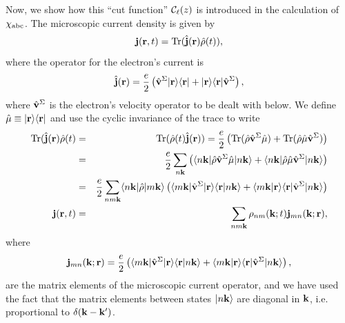 \documentclass{article}
\begin{document}
Now, we show how this ``cut function'' ${\mathbf{\cal C}}_\ell(z)$ is introduced in
the calculation of $\chi_{\mathrm{a}\mathrm{b}\mathrm{c}}$.
The microscopic current density is given by
\begin{equation}\label{jmic}
\mathbf{j}(\mathbf{r},t)=\mathrm{Tr}(\hat{\mathbf{j}}(\mathbf{r})\hat\rho(t)),
\end{equation}
where the operator for the electron's current is
\begin{equation}\label{hatjmic}
\hat{\mathbf{j}}(\mathbf{r})=\frac{e}{2}\left(\hat{\mathbf{v}}^\Sigma| \mathbf{r} \rangle\langle \mathbf{r} |
+| \mathbf{r} \rangle\langle \mathbf{r} |\hat{\mathbf{v}}^\Sigma\right), 
\end{equation}
where $\hat{\mathbf{v}}^\Sigma$ is the electron's velocity operator to be dealt
with below. We define
$\hat\mu\equiv| \mathbf{r} \rangle\langle \mathbf{r} |$ and use the cyclic invariance of
the trace to write
\begin{eqnarray}\label{jmic2}
\mathrm{Tr}(\hat{\mathbf{j}}(\mathbf{r})\hat\rho(t)&=&\mathrm{Tr}(\hat\rho(t)\hat{\mathbf{j}}(\mathbf{r}))=
\frac{e}{2}
\left(
\mathrm{Tr}(\hat\rho\hat{\mathbf{v}}^\Sigma\hat\mu)
+
\mathrm{Tr}(\hat\rho\hat\mu\hat{\mathbf{v}}^\Sigma)
\right)
\nonumber\\
&=&
\frac{e}{2}
\sum_{n\mathbf{k}}
\left(
\langle n\mathbf{k} |\hat\rho\hat{\mathbf{v}}^\Sigma\hat\mu| n\mathbf{k} \rangle
+
\langle n\mathbf{k} |\hat\rho\hat\mu\hat{\mathbf{v}}^\Sigma| n\mathbf{k} \rangle
\right)
\nonumber\\
&=&
\frac{e}{2}
\sum_{nm\mathbf{k}}
\langle n\mathbf{k} |\hat\rho| m\mathbf{k} \rangle
\left(
\langle m\mathbf{k} |\hat{\mathbf{v}}^\Sigma| \mathbf{r} \rangle\langle {\mathbf{r}} | {n\mathbf{k}} \rangle
+
\langle {m\mathbf{k}} | {\mathbf{r}} \rangle\langle \mathbf{r} |\hat{\mathbf{v}}^\Sigma| n\mathbf{k} \rangle
\right)
\nonumber\\
\mathbf{j}(\mathbf{r},t)&=&
\sum_{nm\mathbf{k}}
\rho_{nm}(\mathbf{k};t)\mathbf{j}_{mn}(\mathbf{k};\mathbf{r}),
\end{eqnarray}
where
\begin{equation}\label{jmic3}
\mathbf{j}_{mn}(\mathbf{k};\mathbf{r})=
\frac{e}{2}
\left(
\langle m\mathbf{k} |\hat{\mathbf{v}}^\Sigma| \mathbf{r} \rangle\langle {\mathbf{r}} | {n\mathbf{k}} \rangle
+
\langle {m\mathbf{k}} | {\mathbf{r}} \rangle\langle \mathbf{r} |\hat{\mathbf{v}}^\Sigma| n\mathbf{k} \rangle
\right),
\end{equation}
are the matrix elements of the microscopic current operator,
and we have used the fact that the matrix elements between states $| n\mathbf{k} \rangle$
are diagonal in $\mathbf{k}$, i.e. proportional to $\delta(\mathbf{k}-\mathbf{k}')$.
\end{document}
